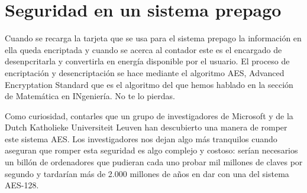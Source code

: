 \section{Seguridad en un sistema prepago}


Cuando se recarga la tarjeta que se usa para el sistema prepago la información en ella queda encriptada y cuando se acerca al contador este es el encargado de desenpcritarla y convertirla en energía disponible por el usuario. El proceso de encriptación y desencriptación se hace mediante el algoritmo AES, Advanced Encryptation Standard que es el algoritmo del que hemos hablado en la sección de Matemática en INgeniería. No te lo pierdas. 

Como curiosidad, contarles que un grupo de investigadores de Microsoft y de la Dutch Katholieke Universiteit Leuven han descubierto una manera de romper este sistema AES. Los investigadores nos dejan algo más tranquilos cuando aseguran que romper esta seguridad es algo complejo y costoso: serían necesarios un billón de ordenadores que pudieran cada uno probar mil millones de claves por segundo y tardarían más de 2.000 millones de años en dar con una del sistema AES-128. 

